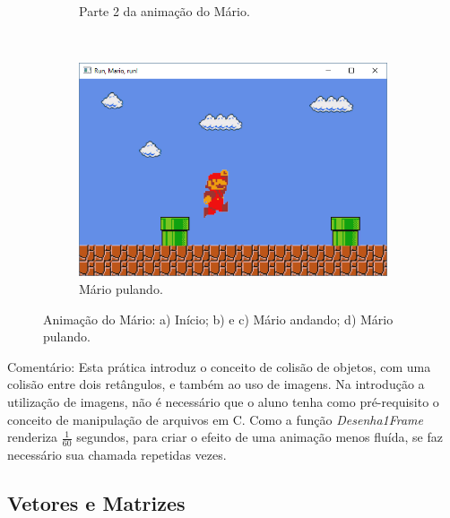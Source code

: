 \begin{renumerate}
\begin{figure}[H]
\begin{subfigure}[t]{0.3\textwidth}
        \caption{Parte 2 da animação do Mário.}
        \label{fig:cap01_ex6c}
    \end{subfigure}
    ~
    \begin{subfigure}[t]{0.3\textwidth}
        \centerline{\includegraphics[width=.9\textwidth]{img/cap1_ex25d}}
        \caption{Mário pulando.}
        \label{fig:cap01_ex6c}
    \end{subfigure}
    \caption{Animação do Mário: a) Início; b) e c) Mário andando; d) Mário pulando.}
  \end{figure}

  Comentário: Esta prática introduz o conceito de colisão de objetos, com uma colisão entre dois retângulos, e também ao uso de imagens. Na introdução a utilização de imagens, não é necessário que o aluno tenha como pré-requisito o conceito de manipulação de arquivos em C. Como a função \emph{Desenha1Frame} renderiza $\frac{1}{60}$ segundos, para criar o efeito de uma animação menos fluída, se faz necessário sua chamada repetidas vezes.

%

\end{renumerate}

\subsection{Vetores e Matrizes}

